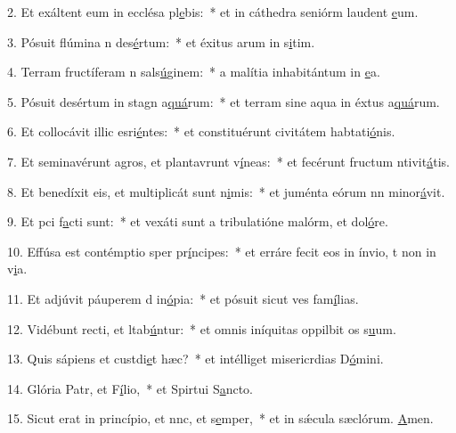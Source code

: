 2. Et exáltent eum in ecclésa pl\uline{e}bis:~* et in cáthedra seniórm laudent \uline{e}um.\par 
3. Pósuit flúmina n des\uline{é}rtum:~* et éxitus arum in s\uline{i}tim.\par 
4. Terram fructíferam n sals\uline{ú}ginem:~* a malítia inhabitántum in \uline{e}a.\par 
5. Pósuit desértum in stagn a\uline{quá}rum:~* et terram sine aqua in éxtus a\uline{quá}rum.\par 
6. Et collocávit illic esri\uline{é}ntes:~* et constituérunt civitátem habtati\uline{ó}nis.\par 
7. Et seminavérunt agros, et plantavrunt v\uline{í}neas:~* et fecérunt fructum ntivit\uline{á}tis.\par 
8. Et benedíxit eis, et multiplicát sunt n\uline{i}mis:~* et juménta eórum nn minor\uline{á}vit.\par 
9. Et pci f\uline{a}cti sunt:~* et vexáti sunt a tribulatióne malórm, et dol\uline{ó}re.\par 
10. Effúsa est contémptio sper pr\uline{í}ncipes:~* et erráre fecit eos in ínvio, t non in v\uline{i}a.\par 
11. Et adjúvit páuperem d in\uline{ó}pia:~* et pósuit sicut ves fam\uline{í}lias.\par 
12. Vidébunt recti, et ltab\uline{ú}ntur:~* et omnis iníquitas oppilbit os s\uline{u}um.\par 
13. Quis sápiens et custdi\uline{e}t hæc?~* et intélliget misericrdias D\uline{ó}mini.\par 
14. Glória Patr, et F\uline{í}lio,~* et Spirtui S\uline{a}ncto.\par 
15. Sicut erat in princípio, et nnc, et s\uline{e}mper,~* et in sǽcula sæclórum. \uline{A}men.\par 
